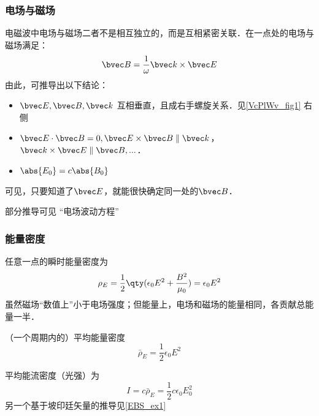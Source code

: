 \subsubsection{电场与磁场}
电磁波中电场与磁场二者不是相互独立的，而是互相紧密关联．在一点处的电场与磁场满足：
\begin{equation}
\bvec B = \frac{1}{\omega} \bvec k \times \bvec E
\end{equation}
由此，可推导出以下结论：
\begin{itemize}
\item $\bvec E, \bvec B, \bvec k$ 互相垂直，且成右手螺旋关系．见\autoref{VcPlWv_fig1} 右侧
\item $\bvec E \cdot \bvec B = 0,\bvec E \times \bvec B \parallel \bvec k$，$\bvec k \times \bvec E \parallel \bvec B, ...$．
\item $\abs{E_0}=c\abs{B_0}$
\end{itemize}
可见，只要知道了$\bvec E$，就能很快确定同一处的$\bvec B$．

部分推导可见 “电场波动方程”

\subsubsection{能量密度}
任意一点的瞬时能量密度为
\begin{equation}\label{VcPlWv_eq2}
\rho_E = \frac{1}{2}\qty(\epsilon_0 E^2 + \frac{B^2}{\mu_0}) = \epsilon_0 E^2
\end{equation}
虽然磁场“数值上”小于电场强度；但能量上，电场和磁场的能量相同，各贡献总能量一半． 

（一个周期内的）平均能量密度
\begin{equation}
\bar \rho_E = \frac{1}{2} \epsilon_0 E^2
\end{equation}

平均能流密度（光强）为
\begin{equation}
I = c \bar \rho_E = \frac12 c\epsilon_0 E_0^2
\end{equation}
另一个基于坡印廷矢量的推导见\autoref{EBS_ex1}~%


